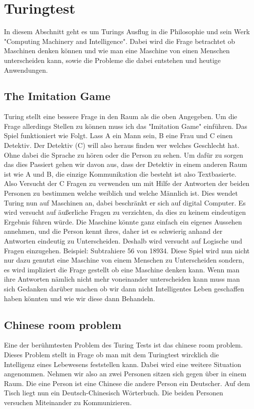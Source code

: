 \section{Turingtest}
In diesem Abschnitt geht es um Turings Ausflug in die Philosophie und sein Werk "Computing Machinery and Intelligence". Dabei wird die Frage betrachtet ob Maschinen denken können und wie man eine Maschine von einen Menschen unterscheiden kann, sowie die Probleme die dabei entstehen und heutige Anwendungen.
\subsection{The Imitation Game}
Turing stellt eine bessere Frage in den Raum als die oben Angegeben. Um die Frage allerdings Stellen zu können muss ich das "Imitation Game" einführen. Das Spiel funktioniert wie Folgt. Lass A ein Mann sein, B eine Frau und C einen Detektiv. Der Detektiv (C) will also heraus finden wer welches Geschlecht hat. Ohne dabei die Sprache zu hören oder die Person zu sehen. Um dafür zu sorgen das dies Passiert gehen wir davon aus, dass der Detektiv in einem anderen Raum ist wie A und B, die einzige Kommunikation die besteht ist also Textbasierte. Also Versucht der C Fragen zu verwenden um mit Hilfe der Antworten der beiden Personen zu bestimmen welche weiblich und welche Männlich ist. Dies wendet Turing nun auf Maschinen an, dabei beschränkt er sich auf digital Computer. Es wird versucht auf äußerliche Fragen zu verzichten, da dies zu keinem eindeutigen Ergebnis führen würde. Die Maschine könnte ganz einfach ein eigenes Aussehen annehmen, und die Person kennt ihres, daher ist es schwierig anhand der Antworten eindeutig zu Unterscheiden. Deshalb wird versucht auf Logische und Fragen einzugehen. Beispiel: Subtrahiere 56 von 18934.\cite{computing} Diese Spiel wird nun nicht nur dazu genutzt eine Maschine von einem Menschen zu Unterscheiden sondern, es wird impliziert die Frage gestellt ob eine Maschine denken kann. Wenn man ihre Antworten nämlich nicht mehr voneinander unterscheiden kann muss man sich Gedanken darüber machen ob wir dann nicht Intelligentes Leben geschaffen haben könnten und wie wir diese dann Behandeln.
\subsection{Chinese room problem}
Eine der berühmtesten Problem des Turing Tests ist das chinese room problem. Dieses Problem stellt in Frage ob man mit dem Turingtest wircklich die Intelligenz eines Lebewesens feststellen kann. Dabei wird eine weitere Situation angenommen. Nehmen wir also an zwei Personen sitzen sich gegen über in einem Raum. Die eine Person ist eine Chinese die andere Person ein Deutscher. Auf dem Tisch liegt nun ein Deutsch-Chinesisch Wörterbuch. Die beiden Personen versuchen Miteinander zu Kommunizieren. 
